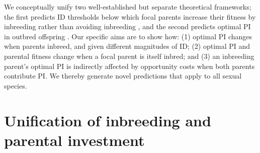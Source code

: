 \documentclass[10pt,letterpaper]{article}
\begin{document}
We conceptually unify two well-established but separate theoretical frameworks; the first predicts ID thresholds below which focal parents increase their fitness by inbreeding rather than avoiding inbreeding \cite[][]{Parker1979}, and the second predicts optimal PI in outbred offspring \cite[][]{Macnair1978}. Our specific aims are to show how: (1) optimal PI changes when parents inbreed, and given different magnitudes of ID; (2) optimal PI and parental fitness change when a focal parent is itself inbred; and (3) an inbreeding parent's optimal PI is indirectly affected by opportunity costs when both parents contribute PI. We thereby generate novel predictions that apply to all sexual species.

\section*{Unification of inbreeding and parental investment}
\end{document}
